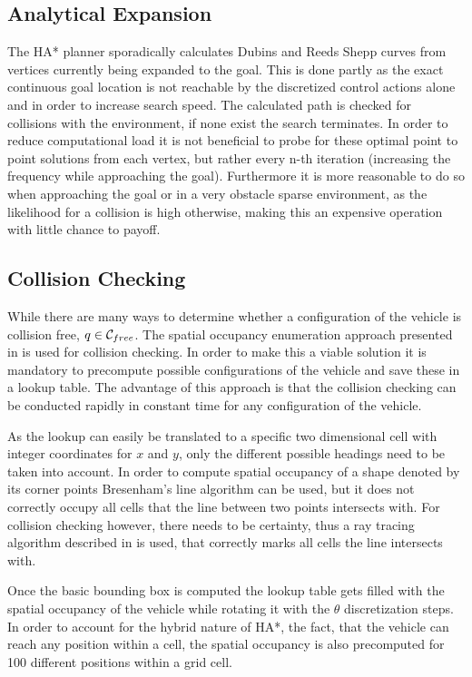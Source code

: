 \subsection{Analytical Expansion}
The HA* planner sporadically calculates Dubins and Reeds Shepp curves from vertices currently being expanded to the goal. This is done partly as the exact continuous goal location is not reachable by the discretized control actions alone and in order to increase search speed. The calculated path is checked for collisions with the environment, if none exist the search terminates. In order to reduce computational load it is not beneficial to probe for these optimal point to point solutions from each vertex, but rather every n-th iteration (increasing the frequency while approaching the goal). Furthermore it is more reasonable to do so when approaching the goal or in a very obstacle sparse environment, as the likelihood for a collision is high otherwise, making this an expensive operation with little chance to payoff.

\subsection{Collision Checking}
While there are many ways to determine whether a configuration of the vehicle is collision free, $q \in \mathcal{C}_{free}$. The spatial occupancy enumeration approach presented in  is used for collision checking. In order to make this a viable solution it is mandatory to precompute possible configurations of the vehicle and save these in a lookup table. The advantage of this approach is that the collision checking can be conducted rapidly in constant time for any configuration of the vehicle.

As the lookup can easily be translated to a specific two dimensional cell with integer coordinates for $x$ and $y$, only the different possible headings need to be taken into account. In order to compute spatial occupancy of a shape denoted by its corner points Bresenham's line algorithm can be used, but it does not correctly occupy all cells that the line between two points intersects with. For collision checking however, there needs to be certainty, thus a ray tracing algorithm described in \cite{Amanatides.2011} is used, that correctly marks all cells the line intersects with.

Once the basic bounding box is computed the lookup table gets filled with the spatial occupancy of the vehicle while rotating it with the $\theta$ discretization steps. In order to account for the hybrid nature of HA*, the fact, that the vehicle can reach any position within a cell, the spatial occupancy is also precomputed for 100 different positions within a grid cell.

